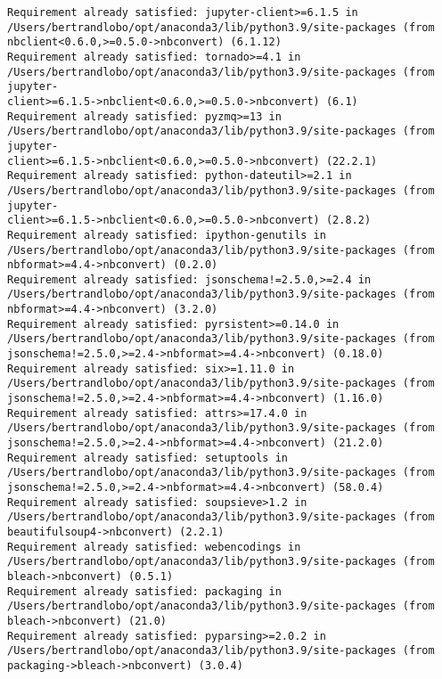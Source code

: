 \documentclass[11pt]{article}
\makeatletter
\newcommand{\boxspacing}{\kern\kvtcb@left@rule\kern\kvtcb@boxsep}
\newcommand{\prompt}[4]{
        {\ttfamily\llap{{\color{#2}[#3]:\hspace{3pt}#4}}\vspace{-\baselineskip}}
    }
\makeatother
\begin{document}
\begin{Verbatim}[commandchars=\\\{\}]
Requirement already satisfied: jupyter-client>=6.1.5 in
/Users/bertrandlobo/opt/anaconda3/lib/python3.9/site-packages (from
nbclient<0.6.0,>=0.5.0->nbconvert) (6.1.12)
Requirement already satisfied: tornado>=4.1 in
/Users/bertrandlobo/opt/anaconda3/lib/python3.9/site-packages (from jupyter-
client>=6.1.5->nbclient<0.6.0,>=0.5.0->nbconvert) (6.1)
Requirement already satisfied: pyzmq>=13 in
/Users/bertrandlobo/opt/anaconda3/lib/python3.9/site-packages (from jupyter-
client>=6.1.5->nbclient<0.6.0,>=0.5.0->nbconvert) (22.2.1)
Requirement already satisfied: python-dateutil>=2.1 in
/Users/bertrandlobo/opt/anaconda3/lib/python3.9/site-packages (from jupyter-
client>=6.1.5->nbclient<0.6.0,>=0.5.0->nbconvert) (2.8.2)
Requirement already satisfied: ipython-genutils in
/Users/bertrandlobo/opt/anaconda3/lib/python3.9/site-packages (from
nbformat>=4.4->nbconvert) (0.2.0)
Requirement already satisfied: jsonschema!=2.5.0,>=2.4 in
/Users/bertrandlobo/opt/anaconda3/lib/python3.9/site-packages (from
nbformat>=4.4->nbconvert) (3.2.0)
Requirement already satisfied: pyrsistent>=0.14.0 in
/Users/bertrandlobo/opt/anaconda3/lib/python3.9/site-packages (from
jsonschema!=2.5.0,>=2.4->nbformat>=4.4->nbconvert) (0.18.0)
Requirement already satisfied: six>=1.11.0 in
/Users/bertrandlobo/opt/anaconda3/lib/python3.9/site-packages (from
jsonschema!=2.5.0,>=2.4->nbformat>=4.4->nbconvert) (1.16.0)
Requirement already satisfied: attrs>=17.4.0 in
/Users/bertrandlobo/opt/anaconda3/lib/python3.9/site-packages (from
jsonschema!=2.5.0,>=2.4->nbformat>=4.4->nbconvert) (21.2.0)
Requirement already satisfied: setuptools in
/Users/bertrandlobo/opt/anaconda3/lib/python3.9/site-packages (from
jsonschema!=2.5.0,>=2.4->nbformat>=4.4->nbconvert) (58.0.4)
Requirement already satisfied: soupsieve>1.2 in
/Users/bertrandlobo/opt/anaconda3/lib/python3.9/site-packages (from
beautifulsoup4->nbconvert) (2.2.1)
Requirement already satisfied: webencodings in
/Users/bertrandlobo/opt/anaconda3/lib/python3.9/site-packages (from
bleach->nbconvert) (0.5.1)
Requirement already satisfied: packaging in
/Users/bertrandlobo/opt/anaconda3/lib/python3.9/site-packages (from
bleach->nbconvert) (21.0)
Requirement already satisfied: pyparsing>=2.0.2 in
/Users/bertrandlobo/opt/anaconda3/lib/python3.9/site-packages (from
packaging->bleach->nbconvert) (3.0.4)
    \end{Verbatim}

    \begin{tcolorbox}[breakable, size=fbox, boxrule=1pt, pad at break*=1mm,colback=cellbackground, colframe=cellborder]
\prompt{In}{incolor}{ }{\boxspacing}
\begin{Verbatim}[commandchars=\\\{\}]

\end{Verbatim}
\end{tcolorbox}


    
    
    
\end{document}
